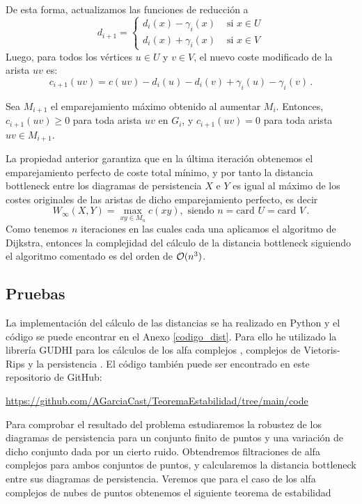 De esta forma, actualizamos las funciones de reducción a
\[
d_{i+1} = \begin{cases}
d_i(x) - \gamma_i(x) & \text{ si } x \in U \\ 
d_i(x) + \gamma_i(x) & \text{ si } x \in V 
\end{cases}
\]
Luego, para todos los vértices $u \in U$ y $v \in V$, el nuevo coste modificado de la arista $uv$ es:
\[
c_{i+1}(uv)=c(uv) - d_i(u) - d_i(v) + \gamma_i(u) - \gamma_i(v)\,.
\]

\begin{property}
Sea $M_{i+1}$ el emparejamiento máximo obtenido al aumentar $M_i$. Entonces, $c_{i+1}(uv) \geq 0$ para toda arista $uv$ en $G_i$, y  $c_{i+1}(uv) = 0$ para toda arista $uv \in M_{i+1}$.
\end{property}

La propiedad anterior garantiza que en la última iteración obtenemos el emparejamiento perfecto de coste total mínimo, y por tanto la distancia bottleneck entre los diagramas de persistencia $X$ e $Y$ es igual al máximo de los costes originales de las aristas de dicho emparejamiento perfecto, es decir
\[
W_\infty(X,Y)=\max_{xy \in M_n} c(xy),\text{ siendo } n= \text{card } U = \text{card } V\,.
\]
Como tenemos $n$ iteraciones en las cuales cada una aplicamos el algoritmo de Dijkstra, entonces la complejidad del cálculo de la distancia bottleneck siguiendo el algoritmo comentado es del orden de $\mathcal{O}(n^3)$.

\subsection{Pruebas}
La implementación del cálculo de las distancias se ha realizado en Python y el código se puede encontrar en el Anexo \ref{codigo_dist}. Para ello he utilizado la librería GUDHI para los cálculos de los alfa complejos \cite{gudhi:AlphaComplex}, complejos de Vietoris-Rips \cite{gudhi:RipsComplex} y la persistencia \cite{gudhi:PersistenceRepresentations}. El código también puede ser encontrado en este repositorio de GitHub:

\begin{center}
\url{https://github.com/AGarciaCast/TeoremaEstabilidad/tree/main/code}
\end{center}

Para comprobar el resultado del problema estudiaremos la robustez de los diagramas de persistencia para un conjunto finito de puntos y una variación de dicho conjunto dada por un cierto ruido. Obtendremos filtraciones de alfa complejos para ambos conjuntos de puntos, y calcularemos la distancia bottleneck entre sus diagramas de persistencia. Veremos que para el caso de los alfa complejos de nubes de puntos obtenemos el siguiente teorema de estabilidad

